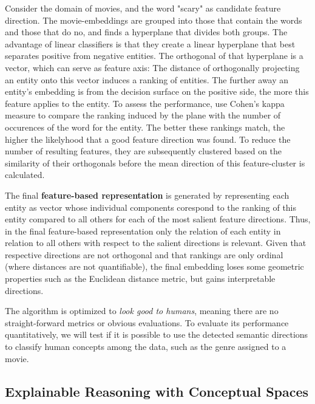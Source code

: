 Consider the domain of movies, and the word "scary" as candidate feature direction. The movie-embeddings are grouped into those that contain the words and those that do no, and finds a hyperplane that divides both groups. The advantage of linear classifiers is that they create a linear hyperplane that best separates positive from negative entities. The orthogonal of that hyperplane is a vector, which can serve as feature axis: The distance of orthogonally projecting an entity onto this vector induces a ranking of entities. The further away an entity's embedding is from the decision surface on the positive side, the more this feature applies to the entity. To assess the performance, \cite{Derrac2015} use Cohen's kappa measure to compare the ranking induced by the plane with the number of occurences of the word for the entity. The better these rankings match, the higher the likelyhood that a good feature direction was found. To reduce the number of resulting features, they are subsequently clustered based on the similarity of their orthogonals before the mean direction of this feature-cluster is calculated. 

The final \textbf{feature-based representation} is generated by representing each entity as vector whose individual components corespond to the ranking of this entity compared to all others for each of the most salient feature directions. Thus, in the final feature-based representation only the relation of each entity in relation to all others with respect to the salient directions is relevant. Given that respective directions are not orthogonal \cite[22]{Derrac2015} and that rankings are only ordinal (where distances are not quantifiable), the final embedding loses some geometric properties such as the Euclidean distance metric, but gains interpretable directions.

The algorithm is optimized to \textit{look good to humans}, meaning there are no straight-forward metrics or obvious evaluations. To evaluate its performance quantitatively, we will test if it is possible to use the detected semantic directions to classify human concepts among the data, such as the genre assigned to a movie.



\subsection{Explainable Reasoning with Conceptual Spaces}
\label{sec:reasoning}
\label{sec:cs_reasoning}

